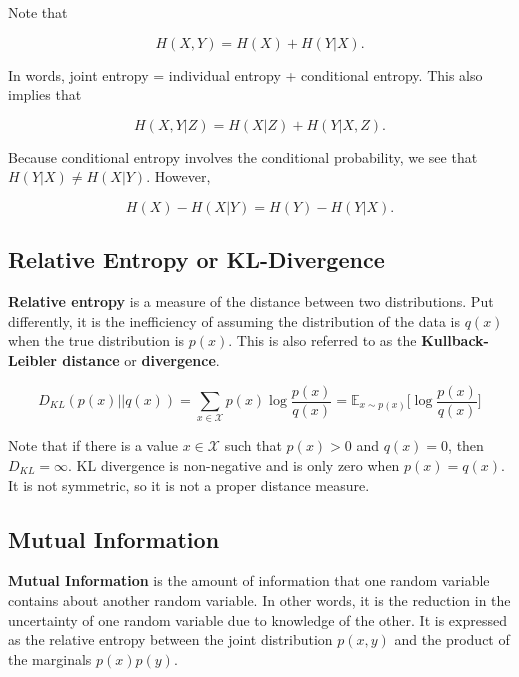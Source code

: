 \noindent Note that

\begin{equation}
	H(X, Y) = H(X) + H(Y | X).
\end{equation}

\noindent In words, joint entropy = individual entropy + conditional entropy. This also implies that

\begin{equation}
	H(X, Y | Z) = H(X | Z) + H(Y | X, Z).
\end{equation}

\noindent Because conditional entropy involves the conditional probability, we see that $H(Y | X) \neq H(X | Y)$. However,

\begin{equation}
	H(X) - H(X | Y) = H(Y) - H(Y | X).
\end{equation}

\subsection{Relative Entropy or KL-Divergence}

\textbf{Relative entropy} is a measure of the distance between two distributions. Put differently, it is the inefficiency of assuming the distribution of the data is $q(x)$ when the true distribution is $p(x)$. This is also referred to as the \textbf{Kullback-Leibler distance} or \textbf{divergence}.

\begin{equation}
	D_{KL} (p(x) || q(x)) = \sum_{x \in \mathcal{X}} p(x) \log \frac{p(x)}{q(x)} = \mathbb{E}_{x \sim p(x)} \Big[ \log \frac{p(x)}{q(x)} \Big]
	\label{eq: KL_definition}
\end{equation}

\noindent Note that if there is a value $x \in \mathcal{X}$ such that $p(x) > 0$ and $q(x) = 0$, then $D_{KL} = \infty$. KL divergence is non-negative and is only zero when $p(x) = q(x)$. It is not symmetric, so it is not a proper distance measure.

\subsection{Mutual Information}

\textbf{Mutual Information} is the amount of information that one random variable contains about another random variable. In other words, it is the reduction in the uncertainty of one random variable due to knowledge of the other. It is expressed as the relative entropy between the joint distribution $p(x, y)$ and the product of the marginals $p(x) p(y)$.


